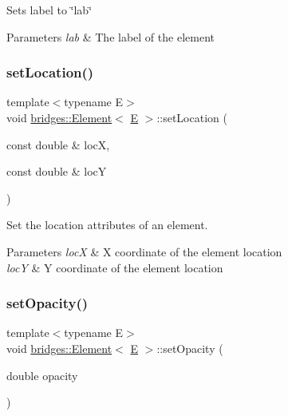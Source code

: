 Sets label to \char`\"{}lab\char`\"{}


\begin{DoxyParams}{Parameters}
{\em lab} & The label of the element \\
\hline
\end{DoxyParams}
\mbox{\label{classbridges_1_1_element_aac1ebe86faf21746aaa3fab407e8e078}} 
\subsubsection{\texorpdfstring{setLocation()}{setLocation()}}
{\footnotesize\ttfamily template$<$typename E$>$ \\
void \mbox{\hyperlink{classbridges_1_1_element}{bridges\+::\+Element}}$<$ \mbox{\hyperlink{namespacebridges_acfb0a4f7877d8f63de3e6862004c50eda3a3ea00cfc35332cedf6e5e9a32e94da}{E}} $>$\+::set\+Location (\begin{DoxyParamCaption}\item[{const double \&}]{locX,  }\item[{const double \&}]{locY }\end{DoxyParamCaption})\hspace{0.3cm}{\ttfamily [inline]}}

Set the location attributes of an element.


\begin{DoxyParams}{Parameters}
{\em locX} & X coordinate of the element location \\
\hline
{\em locY} & Y coordinate of the element location \\
\hline
\end{DoxyParams}
\mbox{\label{classbridges_1_1_element_abbb625dd5a6ce4b855d558ce8fe70a47}} 
\subsubsection{\texorpdfstring{setOpacity()}{setOpacity()}}
{\footnotesize\ttfamily template$<$typename E$>$ \\
void \mbox{\hyperlink{classbridges_1_1_element}{bridges\+::\+Element}}$<$ \mbox{\hyperlink{namespacebridges_acfb0a4f7877d8f63de3e6862004c50eda3a3ea00cfc35332cedf6e5e9a32e94da}{E}} $>$\+::set\+Opacity (\begin{DoxyParamCaption}\item[{double}]{opacity }\end{DoxyParamCaption})\hspace{0.3cm}{\ttfamily [inline]}}

